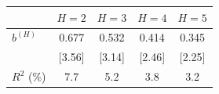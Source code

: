 \begin{tabular}{lcccc}
\toprule
 & $H=2$ & $H=3$ & $H=4$ & $H=5$ \\
\midrule
$b^{(H)}$ & 0.677 & 0.532 & 0.414 & 0.345 \\
 & [3.56] & [3.14] & [2.46] & [2.25] \\
$R^2$ (\%) & 7.7 & 5.2 & 3.8 & 3.2 \\
\bottomrule
\end{tabular}
